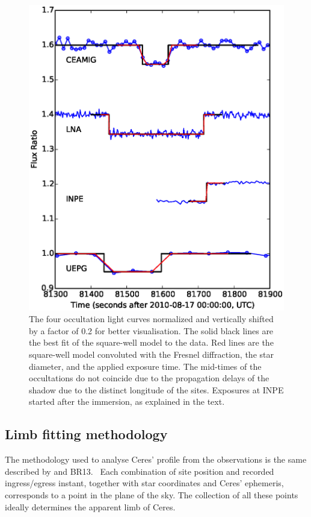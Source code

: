 \documentclass[useAMS,usenatbib]{mn2e}
\begin{document}
\begin{figure}
\includegraphics[scale=0.58]{figures/Ceres_2010_fluxratio.eps} 
\caption{The four occultation light curves normalized and vertically shifted by a factor of 0.2 for better visualisation. The solid black lines are the best fit of the square-well model to the data. Red lines are the square-well model convoluted with the Fresnel diffraction, the star diameter, and the applied exposure time. The mid-times of the occultations do not coincide due to the propagation delays of the shadow due to the distinct longitude of the sites. Exposures at INPE started after the immersion, as explained in the text. \label{Fig: Ceres-2010-curves}}
\end{figure}


\subsection{Limb fitting methodology} \label{Sec: limbfittingmethod}

The methodology used to analyse Ceres' profile from the observations is the same described by \cite{Sicardy2011} and BR13.%
 ~Each combination of site position and recorded ingress/egress instant, together with star coordinates and Ceres' ephemeris, corresponds to a point in the plane of the sky. The collection of all these points ideally determines the apparent limb of Ceres.
\end{document}
